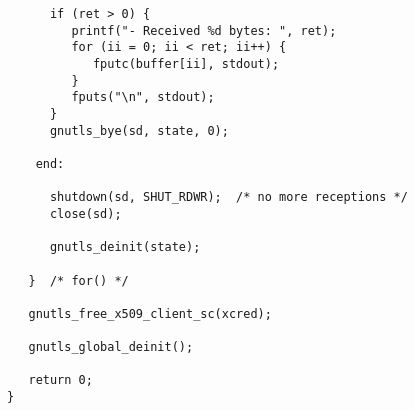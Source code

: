\begin{verbatim}
      if (ret > 0) {
         printf("- Received %d bytes: ", ret);
         for (ii = 0; ii < ret; ii++) {
            fputc(buffer[ii], stdout);
         }
         fputs("\n", stdout);
      }
      gnutls_bye(sd, state, 0);

    end:

      shutdown(sd, SHUT_RDWR);  /* no more receptions */
      close(sd);

      gnutls_deinit(state);

   }  /* for() */

   gnutls_free_x509_client_sc(xcred);

   gnutls_global_deinit();

   return 0;
}

\end{verbatim}
